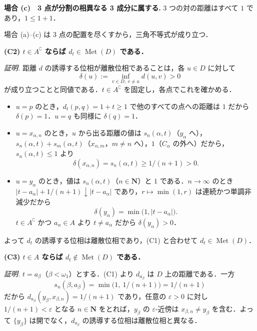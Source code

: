 \documentclass[
  lualatex,ja=standard]{bxjsarticle}
\providecommand{\tightlist}{%
  \setlength{\itemsep}{0pt}\setlength{\parskip}{0pt}}
\begin{document}
\textbf{場合 (c)　3 点が分割の相異なる 3 成分に属する.} 3
つの対の距離はすべて \(1\) であり，\(1 \le 1 + 1\)．

場合 (a)--(c) は 3 点の配置を尽くすから，三角不等式が成り立つ．

\textbf{(C2) \(t \in A^\complement\) ならば
\(d_t \in \operatorname{Met}(D)\) である．}

\emph{証明.} 距離 \(d\) の誘導する位相が離散位相であることは，各
\(u \in D\) に対して
\[\delta(u) := \inf_{v \in D,\ v \ne u} d(u,v) > 0\]
が成り立つことと同値である．\(t \in A^\complement\)
を固定し，各点でこれを確かめる．

\begin{itemize}
\tightlist
\item
  \(u = p\) のとき，\(d_t(p,q) = 1+t \ge 1\) で他のすべての点への距離は
  \(1\) だから \(\delta(p) = 1\)．\(u = q\) も同様に \(\delta(q) = 1\)．
\item
  \(u = x_{\alpha,n}\) のとき，\(u\) から出る距離の値は
  \(s_n(\alpha,t)\)（\(y_\alpha\)
  へ），\(s_n(\alpha,t) + s_m(\alpha,t)\)（\(x_{\alpha,m}\)，\(m \ne n\)
  へ），\(1\)（\(C_\alpha\) の外へ）だから，\(s_n(\alpha,t) \le 1\) より
  \[\delta(x_{\alpha,n}) = s_n(\alpha,t) \ge 1/(n+1) > 0.\]
\item
  \(u = y_\alpha\) のとき，値は
  \(s_n(\alpha,t)\)（\(n \in \mathbf{N}\)）と \(1\)
  である．\(n \to \infty\) のとき
  \(\lvert t-a_\alpha\rvert + 1/(n+1) \downarrow \lvert t-a_\alpha\rvert\)
  であり，\(r \mapsto \min(1,r)\) は連続かつ単調非減少だから
  \[\delta(y_\alpha) = \min\bigl(1, \lvert t - a_\alpha\rvert\bigr).\]
  \(t \in A^\complement\) かつ \(a_\alpha \in A\) より
  \(t \ne a_\alpha\) だから \(\delta(y_\alpha) > 0\)．
\end{itemize}

よって \(d_t\) の誘導する位相は離散位相であり，(C1) と合わせて
\(d_t \in \operatorname{Met}(D)\)．

\textbf{(C3) \(t \in A\) ならば \(d_t \notin \operatorname{Met}(D)\)
である．}

\emph{証明.} \(t = a_\beta\)（\(\beta < \omega_1\)）とする．(C1) より
\(d_{a_\beta}\) は \(D\) 上の距離である．一方
\[s_n(\beta, a_\beta) = \min\bigl(1,\ 1/(n+1)\bigr) = 1/(n+1)\] だから
\(d_{a_\beta}(y_\beta, x_{\beta,n}) = 1/(n+1)\) であり，任意の
\(\varepsilon > 0\) に対し \(1/(n+1) < \varepsilon\) となる
\(n \in \mathbf{N}\) をとれば，\(y_\beta\) の \(\varepsilon\)-近傍は
\(x_{\beta,n} \ne y_\beta\) を含む．よって \(\{y_\beta\}\)
は開でなく，\(d_{a_\beta}\) の誘導する位相は離散位相と異なる．
\end{document}
